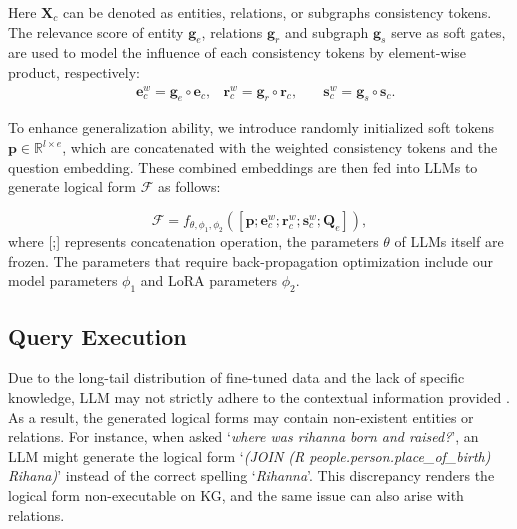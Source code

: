 Here $\boldsymbol{X}_{c}$ can be denoted as entities, relations, or subgraphs consistency tokens.
The relevance score of entity $\boldsymbol{g}_{e}$, relations $\boldsymbol{g}_{r}$ and subgraph $\boldsymbol{g}_{s}$ serve as soft gates, are used to model the influence of each consistency tokens by element-wise product, respectively:
\begin{equation}
\begin{aligned}
&\boldsymbol{e}_{c}^{w} = \boldsymbol{g}_{e}\circ \boldsymbol{e}_{c}, 
&\boldsymbol{r}_{c}^{w} = \boldsymbol{g}_{r}\circ \boldsymbol{r}_{c},  \quad
&\boldsymbol{s}_{c}^{w} = \boldsymbol{g}_{s}\circ \boldsymbol{s}_{c}.
\end{aligned}
\end{equation}

To enhance generalization ability, we introduce randomly initialized soft tokens $\boldsymbol{p} \in \mathbb{R}^{l \times e}$, which are concatenated with the weighted consistency tokens and the question embedding. These combined embeddings are then fed into LLMs to generate logical form $\mathcal{F}$ as follows:

\begin{equation}
 \mathcal{F} = f_{\theta,\phi_1,\phi_2}([\boldsymbol{p};\boldsymbol{e}_{c}^{w};\boldsymbol{r}_{c}^{w};\boldsymbol{s}_{c}^{w};\boldsymbol{Q}_{e}]),
\end{equation}
where [;] represents concatenation operation, the parameters $\theta$ of LLMs itself are frozen. The parameters that require back-propagation optimization include our model parameters $\phi_1$ and LoRA parameters $\phi_2$.


\subsection{Query Execution} \label{sec:Query Execution}
Due to the long-tail distribution of fine-tuned data and the lack of specific knowledge, LLM may not strictly adhere to the contextual information provided \cite{chatkbqa}. As a result, the generated logical forms may contain non-existent entities or relations. For instance, when asked `\textit{where was rihanna born and raised?}', an LLM might generate the logical form `\textit{(JOIN (R people.person.place\_of\_birth) Rihana)}' instead of the correct spelling `\textit{Rihanna}'. This discrepancy renders the logical form non-executable on KG, and the same issue can also arise with relations.

